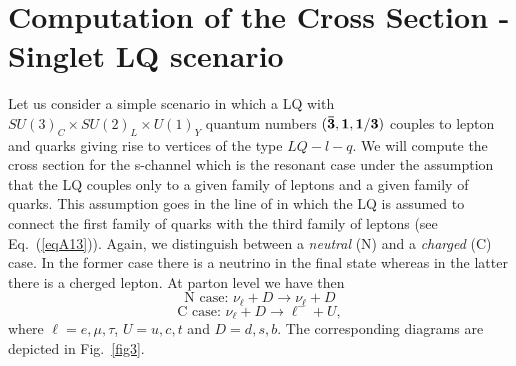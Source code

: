\documentclass[aps,preprint,tightenlines,floatfix,superscriptaddress,nofootinbib,showpacs]{revtex4-1}
\begin{document}
\section{Computation of the Cross Section - Singlet LQ scenario}
Let us consider a simple scenario in which a LQ with $SU(3)_C\times SU(2)_L\times U(1)_Y$ quantum numbers $(\bf{\bar{3}},\bf{1},\bf{1/3})$ couples to lepton and quarks giving rise to vertices of the type $LQ-l-q$. We will compute the cross section for the s-channel which is the resonant case under the assumption that the LQ couples only to a given family of leptons and a given family of quarks. This assumption goes in the line of \cite{Barger} in which the LQ is assumed to connect the first family of quarks with the third family of leptons (see Eq.~(\ref{eqA13})). Again, we distinguish between a \emph{neutral} (N) and a \emph{charged} (C) case. In the former case there is a neutrino in the final state whereas in the latter there is a cherged lepton. At parton level we have then
$$\mbox{N case: } \nu_{\ell} + D\to \nu_{\ell} + D$$ 
$$\mbox{C case: } \nu_{\ell} + D\to \ell^- + U,$$
where $\ell=e,\mu,\tau$, $U=u,c,t$ and $D=d,s,b$. The corresponding diagrams are depicted in Fig.~\ref{fig3}.
\end{document}
